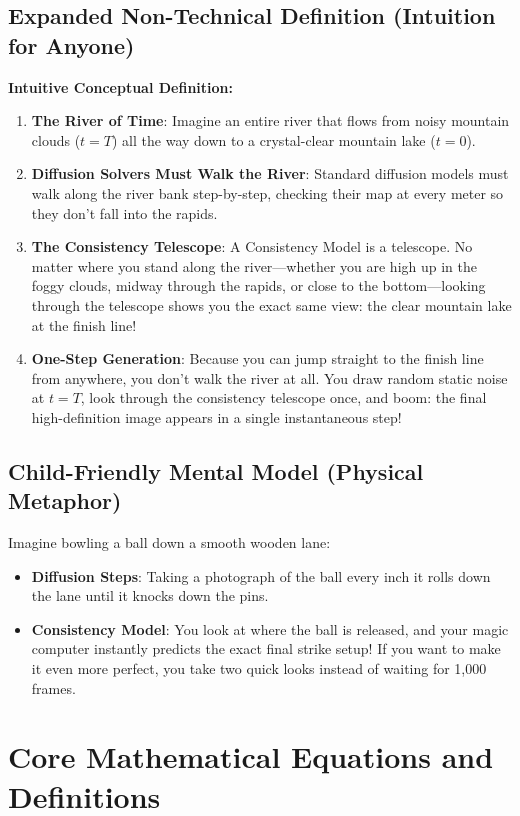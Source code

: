 \documentclass[11pt,a4paper]{article}
\theoremstyle{definition}
\begin{document}
\subsection{Expanded Non-Technical Definition (Intuition for Anyone)}
\textbf{Intuitive Conceptual Definition:}
\begin{enumerate}
    \item \textbf{The River of Time}: Imagine an entire river that flows from noisy mountain clouds ($t = T$) all the way down to a crystal-clear mountain lake ($t = 0$).
    \item \textbf{Diffusion Solvers Must Walk the River}: Standard diffusion models must walk along the river bank step-by-step, checking their map at every meter so they don't fall into the rapids.
    \item \textbf{The Consistency Telescope}: A Consistency Model is a telescope. No matter where you stand along the river—whether you are high up in the foggy clouds, midway through the rapids, or close to the bottom—looking through the telescope shows you the exact same view: the clear mountain lake at the finish line!
    \item \textbf{One-Step Generation}: Because you can jump straight to the finish line from anywhere, you don't walk the river at all. You draw random static noise at $t = T$, look through the consistency telescope once, and boom: the final high-definition image appears in a single instantaneous step!
\end{enumerate}

\subsection{Child-Friendly Mental Model (Physical Metaphor)}
Imagine bowling a ball down a smooth wooden lane:
\begin{itemize}
    \item \textbf{Diffusion Steps}: Taking a photograph of the ball every inch it rolls down the lane until it knocks down the pins.
    \item \textbf{Consistency Model}: You look at where the ball is released, and your magic computer instantly predicts the exact final strike setup! If you want to make it even more perfect, you take two quick looks instead of waiting for 1,000 frames.
\end{itemize}

\section{Core Mathematical Equations and Definitions}
\end{document}
